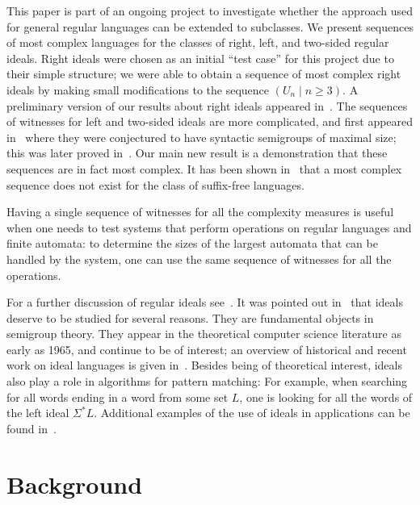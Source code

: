 \documentclass[final]{dmtcs-episciences}
\renewcommand{\ge}{\geqslant}
\newcommand{\Sig}{\Sigma}
\theoremstyle{definition}
\theoremstyle{remark}
\begin{document}
This paper is part of an ongoing project to investigate whether the approach used for general regular languages can be extended to subclasses. 
We present sequences of most complex languages for the classes of right, left, and two-sided regular  ideals. 
Right ideals were chosen as an initial ``test case'' for this project due to their simple structure; we were able to obtain a sequence of most complex right ideals by making small modifications to the sequence $(U_n \mid n \ge 3)$.
A preliminary version of our results about right ideals appeared in~\cite{BrDa14}. 
The sequences of witnesses for left and two-sided ideals are more complicated, and first appeared in~\cite{BrYe11} where they were conjectured to have syntactic semigroups of maximal size; this was later proved in~\cite{BSY15}.
Our main new result is a demonstration that these sequences are in fact most complex.
It has been shown in~\cite{BrSz15a} that a most complex sequence does not exist for the class of suffix-free languages.

Having a single sequence of witnesses for all the complexity measures is useful when one needs to test systems that perform operations on regular languages and finite automata: to determine the sizes of the largest automata that can be handled by the system, one can use the same sequence of witnesses for all the operations.

For a further discussion of regular ideals see~\cite{BrDa14,BJL13,BrSz14,BSY15,BrYe11}.
It was pointed out in~\cite{BJL13} that 
ideals deserve to be studied for several reasons. 
They are fundamental objects in semigroup theory. They appear in the theoretical computer science literature 
as early as 1965,
and continue to be of interest; an overview of historical and recent work on ideal languages is given in~\cite{BJL13}.
Besides being of theoretical interest, ideals also play a role in algorithms for pattern matching: 
For example, when searching for all words ending in a word from some set $L$, one is looking for all the words of the left ideal $\Sig^*L$.
Additional examples of the use of ideals in applications can be found in~\cite{AhCo75,CrHa90,CHL07,YCDLK06}. 

\section{Background}
\label{sec:background}
\end{document}
